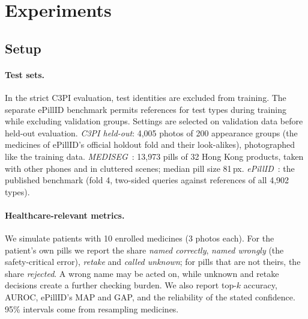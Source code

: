 \section{Experiments}
\label{sec:experiments}

\subsection{Setup}
\label{sec:setup}

\paragraph{Test sets.} In the strict C3PI evaluation, test identities are excluded from training. The separate ePillID benchmark permits references for test types during training while excluding validation groups. Settings are selected on validation data before held-out evaluation. \emph{C3PI held-out}: 4,005 photos of 200 appearance groups (the medicines of
ePillID's official holdout fold and their look-alikes), photographed like the training data.
\emph{MEDISEG}~\citep{mediseg2026}: 13,973 pills of 32 Hong Kong products, taken with other phones and in cluttered
scenes; median pill size 81\,px. \emph{ePillID}~\citep{usuyama2020epillid}: the published benchmark (fold 4,
two-sided queries against references of all 4,902 types).

\paragraph{Healthcare-relevant metrics.} We simulate patients with 10 enrolled medicines (3 photos each). For the
patient's own pills we report the share \emph{named correctly}, \emph{named wrongly} (the safety-critical error),
\emph{retake} and \emph{called unknown}; for pills that are not theirs, the share \emph{rejected}. A wrong name may be
acted on, while unknown and retake decisions create a further checking burden. We also report top-$k$ accuracy, AUROC,
ePillID's MAP and GAP, and the reliability of the stated confidence. 95\% intervals come from resampling medicines.


